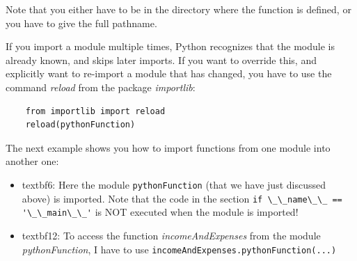 Note that you either have to be in the directory where the function is defined, or you have to give the full pathname.

If you import a module multiple times, Python recognizes that the module is already known, and skips later imports. If you want to override this, and explicitly want to re-import a module that has changed, you have to use the command \emph{reload} from the package \emph{importlib}:

\begin{lstlisting}
    from importlib import reload
    reload(pythonFunction)
\end{lstlisting}

The next example shows you how to import functions from one module into another one:



\begin{itemize}
  \item textbf{6:} Here the module \lstinline{pythonFunction} (that we have just discussed above) is imported. Note that the code in the section \lstinline{if \_\_name\_\_ == '\_\_main\_\_'} is NOT executed when the module is imported!
  \item textbf{12:} To access the function \emph{incomeAndExpenses} from the module \emph{pythonFunction}, I have to use \lstinline{incomeAndExpenses.pythonFunction(...)}
\end{itemize}


